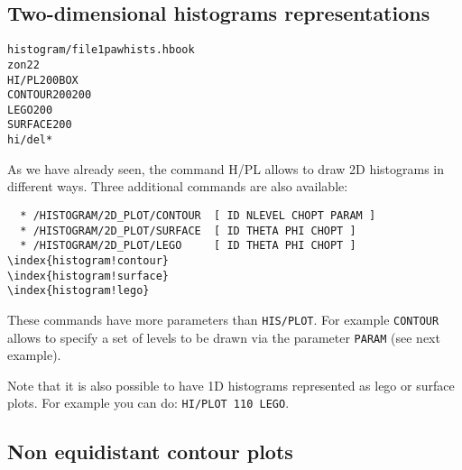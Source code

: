 \clearpage

\subsection{Two-dimensional histograms representations}
\begin{alltt}
      histogram/file 1 pawhists.hbook
      zon 2 2
     HI/PL 200 BOX
     CONTOUR 200 20 0
     LEGO 200
     SURFACE 200
      hi/del *
\end{alltt} 
\begin{DinglistE}
\item As we have already seen, the command H/PL allows to draw 2D
      histograms in different ways. Three additional commands are also
      available:
\begin{verbatim}
  * /HISTOGRAM/2D_PLOT/CONTOUR  [ ID NLEVEL CHOPT PARAM ]
  * /HISTOGRAM/2D_PLOT/SURFACE  [ ID THETA PHI CHOPT ]
  * /HISTOGRAM/2D_PLOT/LEGO     [ ID THETA PHI CHOPT ]
\index{histogram!contour}
\index{histogram!surface}
\index{histogram!lego}
\end{verbatim}
      These commands have more parameters than {\tt HIS/PLOT}. For example
      {\tt CONTOUR} allows to specify a set of levels to be drawn
      via the parameter {\tt PARAM} (see next example).
\item Note that it is also possible to have 1D histograms represented as
      lego or surface plots. For example you can do: {\tt HI/PLOT 110 LEGO}.
\end{DinglistE}

\clearpage

\subsection{Non equidistant contour plots}

